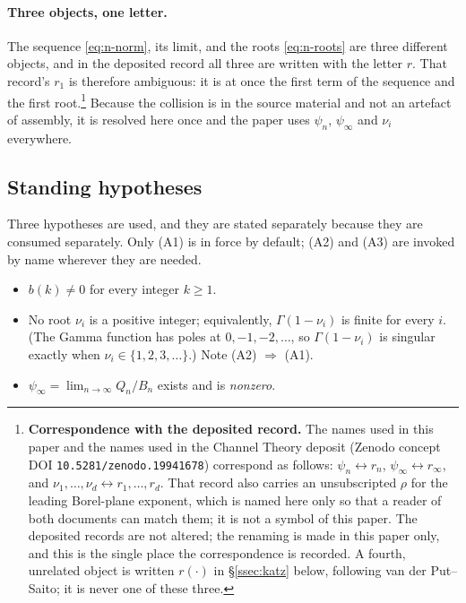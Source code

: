\paragraph{Three objects, one letter.}
The sequence \eqref{eq:n-norm}, its limit, and the roots \eqref{eq:n-roots} are
three different objects, and in the deposited record all three are written with
the letter $r$. That record's $r_1$ is therefore ambiguous: it is at once the
first term of the sequence and the first root.\footnote{%
  \textbf{Correspondence with the deposited record.} The names used in this
  paper and the names used in the Channel Theory deposit (Zenodo concept DOI
  \texttt{10.5281/zenodo.19941678}) correspond as follows:
  $\psi_n\leftrightarrow r_n$, $\psi_\infty\leftrightarrow r_\infty$, and
  $\nu_1,\dots,\nu_d\leftrightarrow r_1,\dots,r_d$. That record also carries an
  unsubscripted $\rho$ for the leading Borel-plane exponent, which is named
  here only so that a reader of both documents can match them; it is not a
  symbol of this paper. The deposited
  records are not altered; the renaming is made in this paper only, and this is
  the single place the correspondence is recorded. A fourth, unrelated object
  is written $r(\cdot)$ in \S\ref{ssec:katz} below, following van der
  Put--Saito; it is never one of these three.}
Because the collision is in the source material and not an artefact of
assembly, it is resolved here once and the paper uses $\psi_n$, $\psi_\infty$ and
$\nu_i$ everywhere.

\subsection{Standing hypotheses}\label{ssec:hypotheses}

Three hypotheses are used, and they are stated separately because they are
consumed separately. Only (A1) is in force by default; (A2) and (A3) are
invoked by name wherever they are needed.

\begin{itemize}
\item[\textbf{(A1)}] $b(k)\neq0$ for every integer $k\ge1$.
\item[\textbf{(A2)}] No root $\nu_i$ is a positive integer; equivalently,
  $\Gamma(1-\nu_i)$ is finite for every $i$. (The Gamma function has poles
  at $0,-1,-2,\dots$, so $\Gamma(1-\nu_i)$ is singular exactly when
  $\nu_i\in\{1,2,3,\dots\}$.) Note (A2) $\Rightarrow$ (A1).
\item[\textbf{(A3)}] $\psi_\infty=\lim_{n\to\infty}Q_n/B_n$ exists and is
  \emph{nonzero}.
\end{itemize}

